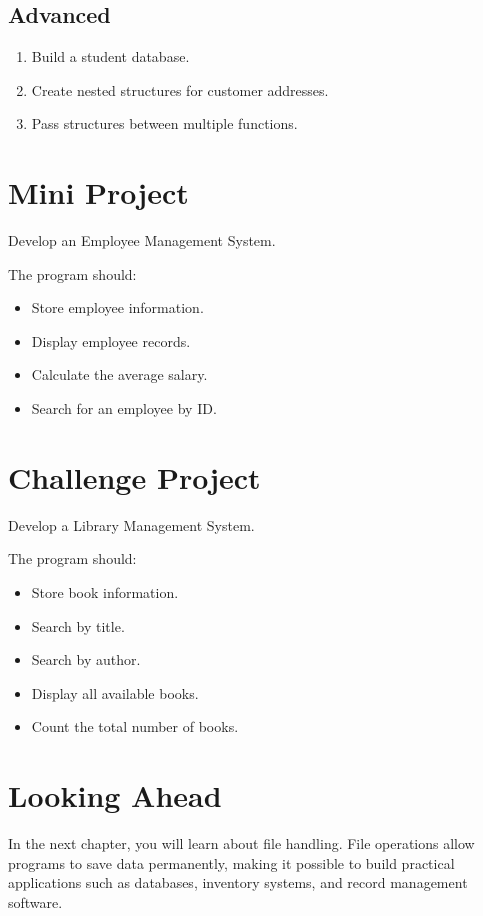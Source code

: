 \documentclass[12pt,openany]{book}
\begin{document}
\subsection*{Advanced}

\begin{enumerate}
    \item Build a student database.
    \item Create nested structures for customer addresses.
    \item Pass structures between multiple functions.
\end{enumerate}

\section{Mini Project}

Develop an Employee Management System.

The program should:

\begin{itemize}
    \item Store employee information.
    \item Display employee records.
    \item Calculate the average salary.
    \item Search for an employee by ID.
\end{itemize}

\section{Challenge Project}

Develop a Library Management System.

The program should:

\begin{itemize}
    \item Store book information.
    \item Search by title.
    \item Search by author.
    \item Display all available books.
    \item Count the total number of books.
\end{itemize}

\section{Looking Ahead}

In the next chapter, you will learn about file handling. File operations allow programs to save data permanently, making it possible to build practical applications such as databases, inventory systems, and record management software.
\end{document}
